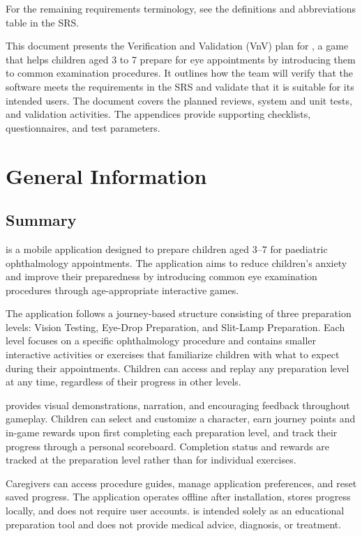 \documentclass[10pt,titlepage]{article}
\begin{document}
For the remaining requirements terminology, see the definitions and
abbreviations table in the SRS.

\newpage


This document presents the Verification and Validation (VnV) plan for
\progname{}, a game that helps children aged 3 to 7 prepare for eye
appointments by introducing them to common examination procedures. It outlines
how the team will verify that the software meets the requirements in the SRS
and validate that it is suitable for its intended users. The document covers
the planned reviews, system and unit tests, and validation activities. The
appendices provide supporting checklists, questionnaires, and test parameters.

\section{General Information}\label{sec:section2}

\subsection{Summary}

\progname{} is a mobile application designed to prepare children aged 3--7
for paediatric ophthalmology appointments. The application aims to reduce
children's anxiety and improve their preparedness by introducing common
eye examination procedures through age-appropriate interactive games.

The application follows a journey-based structure consisting of three
preparation levels: Vision Testing, Eye-Drop Preparation, and Slit-Lamp
Preparation. Each level focuses on a specific ophthalmology procedure
and contains smaller interactive activities or exercises that familiarize
children with what to expect during their appointments. Children can
access and replay any preparation level at any time, regardless of their
progress in other levels.

\progname{} provides visual demonstrations, narration, and encouraging
feedback throughout gameplay. Children can select and customize a
character, earn journey points and in-game rewards upon first completing
each preparation level, and track their progress through a personal
scoreboard. Completion status and rewards are tracked at the preparation
level rather than for individual exercises.

Caregivers can access procedure guides, manage application preferences,
and reset saved progress. The application operates offline after
installation, stores progress locally, and does not require user
accounts. \progname{} is intended solely as an educational preparation
tool and does not provide medical advice, diagnosis, or treatment.
\end{document}
